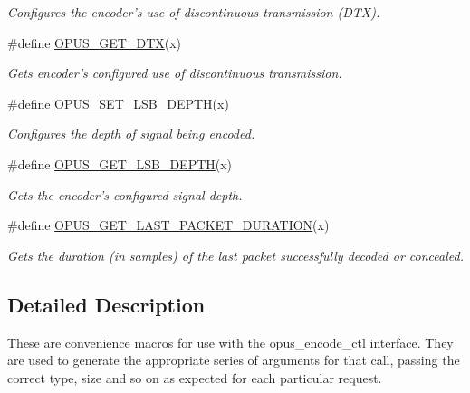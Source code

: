 \begin{DoxyCompactItemize}
\begin{DoxyCompactList}\small\item\em Configures the encoder's use of discontinuous transmission (DTX). \item\end{DoxyCompactList}\item 
\#define \hyperlink{group__opus__encoderctls_gaafbb44454e9f57232b85e4e087337ded}{OPUS\_\-GET\_\-DTX}(x)
\begin{DoxyCompactList}\small\item\em Gets encoder's configured use of discontinuous transmission. \item\end{DoxyCompactList}\item 
\#define \hyperlink{group__opus__encoderctls_gaa23940eb477ff617edc14b8d66e104c0}{OPUS\_\-SET\_\-LSB\_\-DEPTH}(x)
\begin{DoxyCompactList}\small\item\em Configures the depth of signal being encoded. \item\end{DoxyCompactList}\item 
\#define \hyperlink{group__opus__encoderctls_gab5ecdfbbbabfaefc2f2ca79cf4a3b08f}{OPUS\_\-GET\_\-LSB\_\-DEPTH}(x)
\begin{DoxyCompactList}\small\item\em Gets the encoder's configured signal depth. \item\end{DoxyCompactList}\item 
\#define \hyperlink{group__opus__encoderctls_ga8f3d070f56b75f2a7af54e5776b387fa}{OPUS\_\-GET\_\-LAST\_\-PACKET\_\-DURATION}(x)
\begin{DoxyCompactList}\small\item\em Gets the duration (in samples) of the last packet successfully decoded or concealed. \item\end{DoxyCompactList}\end{DoxyCompactItemize}


\subsection{Detailed Description}
These are convenience macros for use with the {\ttfamily opus\_\-encode\_\-ctl} interface. They are used to generate the appropriate series of arguments for that call, passing the correct type, size and so on as expected for each particular request.

